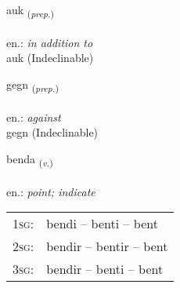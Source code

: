 \documentclass[frontgrid, backgrid]{flacards}\usepackage[]{graphicx}\usepackage[]{xcolor}
\begin{document}
\renewcommand{\blhead}{\vskip5pt {\small\bfseries\footnotesize Forsetning | Preposition }}
\renewcommand{\bcfoot}{\vskip5pt \hspace{2pt}{\small\bfseries\footnotesize 1K}}


{auk \small{\textsubscript{(\textit{prep.})}} \\[1ex]
\textphonetic{[œiːk]} \\
en.: \emph{in addition to} \\  [2ex]
auk (Indeclinable)}


\renewcommand{\flhead}{\vskip5pt \fboxsep=0pt {\small\bfseries\footnotesize Forsetning | Preposition}}
\renewcommand{\fcfoot}{\vskip5pt \fboxsep=0pt \hspace{2pt}{\small\bfseries\footnotesize 1K}}

\renewcommand{\blhead}{\vskip5pt {\small\bfseries\footnotesize Forsetning | Preposition }}
\renewcommand{\bcfoot}{\vskip5pt \hspace{2pt}{\small\bfseries\footnotesize 1K}}


{gegn \small{\textsubscript{(\textit{prep.})}} \\[1ex]
\textphonetic{[cɛkn̥]} \\
en.: \emph{against} \\  [2ex]
gegn (Indeclinable)}

\renewcommand{\flhead}{\vskip5pt \fboxsep=0pt {\small\bfseries\footnotesize Sagnorð | Verb}}
\renewcommand{\fcfoot}{\vskip5pt \fboxsep=0pt \hspace{2pt}{\small\bfseries\footnotesize 1K}}

\renewcommand{\blhead}{\vskip5pt {\small\bfseries\footnotesize Sagnorð | Verb }}
\renewcommand{\bcfoot}{\vskip5pt \hspace{2pt}{\small\bfseries\footnotesize 1K}}


{benda \small{\textsubscript{(\textit{v.})}} \\[1ex] %
\textphonetic{[pɛnta]} \\
en.: \emph{point; indicate} \\  [2ex]
\renewcommand*{\arraystretch}{0.8}
\begin{tabular}{p{1cm}l}
\textsc{1sg}: & bendi -- benti -- bent \\ 
\textsc{2sg}: & bendir -- bentir -- bent \\ 
\textsc{3sg}: & bendir -- benti -- bent \\ 
\end{tabular}
}
\end{document}
